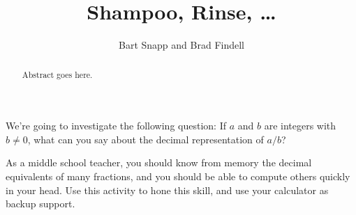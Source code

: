 \documentclass{ximera}
\title{Shampoo, Rinse, \dots}
\author{Bart Snapp and Brad Findell}
\begin{document}
\begin{abstract}
Abstract goes here.  
\end{abstract}
\maketitle

\label{A:Shampoo}

We're going to investigate the following question: If $a$ and $b$ are
integers with $b \ne 0$, what can you say about the decimal
representation of $a/b$? 

As a middle school teacher, you should know from memory the decimal equivalents of many fractions, and 
you should be able to compute others quickly in your head.  Use this activity to hone this skill, and use your calculator 
as backup support.  
\end{document}

